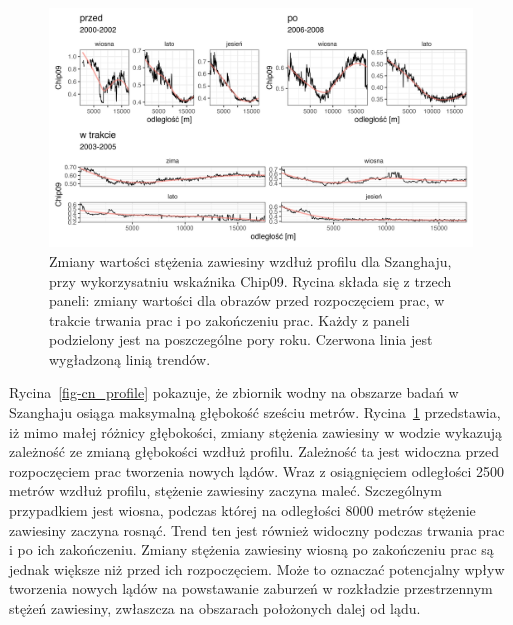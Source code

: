\documentclass{amuthesis}
\begin{document}
\begin{figure}[t]

{\centering \includegraphics[width=6.77083in,height=\textheight]{figures/china/chip_profile.png}

}

\caption{\label{fig-cn_chip_profile}Zmiany wartości stężenia zawiesiny
wzdłuż profilu dla Szanghaju, przy wykorzysatniu wskaźnika Chip09.
Rycina składa się z trzech paneli: zmiany wartości dla obrazów przed
rozpoczęciem prac, w trakcie trwania prac i po zakończeniu prac. Każdy z
paneli podzielony jest na poszczególne pory roku. Czerwona linia jest
wygładzoną linią trendów.}

\end{figure}

Rycina~\ref{fig-cn_profile} pokazuje, że zbiornik wodny na obszarze
badań w Szanghaju osiąga maksymalną głębokość sześciu metrów.
Rycina~\ref{fig-cn_chip_profile} przedstawia, iż mimo małej różnicy
głębokości, zmiany stężenia zawiesiny w wodzie wykazują zależność ze
zmianą głębokości wzdłuż profilu. Zależność ta jest widoczna przed
rozpoczęciem prac tworzenia nowych lądów. Wraz z osiągnięciem odległości
2500 metrów wzdłuż profilu, stężenie zawiesiny zaczyna maleć.
Szczególnym przypadkiem jest wiosna, podczas której na odległości 8000
metrów stężenie zawiesiny zaczyna rosnąć. Trend ten jest również
widoczny podczas trwania prac i po ich zakończeniu. Zmiany stężenia
zawiesiny wiosną po zakończeniu prac są jednak większe niż przed ich
rozpoczęciem. Może to oznaczać potencjalny wpływ tworzenia nowych lądów
na powstawanie zaburzeń w rozkładzie przestrzennym stężeń zawiesiny,
zwłaszcza na obszarach położonych dalej od lądu.
\end{document}
